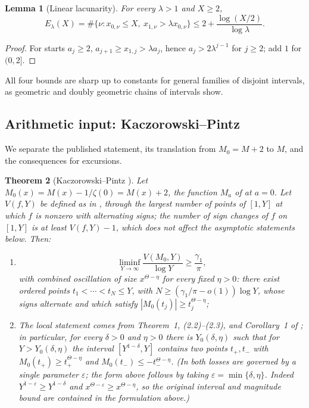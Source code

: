 \documentclass[11pt]{amsart}
\numberwithin{equation}{section}
\theoremstyle{plain}
\newtheorem{theorem}{Theorem}[section]
\newtheorem{lemma}[theorem]{Lemma}
\theoremstyle{definition}
\theoremstyle{remark}
\begin{document}
\begin{lemma}[Linear lacunarity]
\label{lem:linear-lacunary}
For every $\lambda>1$ and $X\ge2$,
\begin{equation}
\label{eq:linear-lacunary-count}
E_\lambda(X)=\#\{\nu:x_{0,\nu}\le X,\ x_{1,\nu}>\lambda x_{0,\nu}\}
\le2+\frac{\log(X/2)}{\log\lambda}.
\end{equation}
\end{lemma}

\begin{proof}
For starts $a_j\ge2$, $a_{j+1}\ge x_{1,j}>\lambda a_j$, hence
$a_j>2\lambda^{j-1}$ for $j\ge2$; add $1$ for $(0,2]$.
\end{proof}

All four bounds are sharp up to constants for general families of disjoint
intervals, as geometric and doubly geometric chains of intervals show.

\subsection{Arithmetic input: Kaczorowski--Pintz}

We separate the published statement, its translation from $M_0=M+2$ to
$M$, and the consequences for excursions.

\begin{theorem}[Kaczorowski--Pintz {\cite{KP86}}]
\label{thm:KP-quoted}
Let $M_0(x)=M(x)-1/\zeta(0)=M(x)+2$, the function $M_a$ of \cite{KP86} at
$a=0$. Let $V(f,Y)$ be defined as in \cite{KP86}, through the largest number of
points of $[1,Y]$ at which $f$ is nonzero with alternating signs; the number
of sign changes of $f$ on $[1,Y]$ is at least $V(f,Y)-1$, which does not
affect the asymptotic statements below. Then:
\begin{enumerate}[label=\textup{(\roman*)}]
\item \cite[Corollary~4, p.~178, (2.13)--(2.15)]{KP86}
\begin{equation}
\label{eq:KP-signchanges}
\liminf_{Y\to\infty}\frac{V(M_0,Y)}{\log Y}\ge\frac{\gamma_1}{\pi},
\end{equation}
with combined oscillation of size $x^{\Theta-\eta}$ for every fixed
$\eta>0$: there exist ordered points $t_1<\cdots<t_N\le Y$, with
$N\ge(\gamma_1/\pi-o(1))\log Y$, whose signs alternate and which satisfy
$|M_0(t_j)|\ge t_j^{\Theta-\eta}$;
\item The local statement comes from Theorem~1, (2.2)--(2.3), and
Corollary~1 of \cite{KP86}; in particular,
for every $\delta>0$ and $\eta>0$ there is $Y_0(\delta,\eta)$ such that for
$Y>Y_0(\delta,\eta)$ the interval $[Y^{1-\delta},Y]$ contains two points
$t_+,t_-$ with $M_0(t_+)\ge t_+^{\Theta-\eta}$ and
$M_0(t_-)\le-t_-^{\Theta-\eta}$. (In \cite{KP86} both losses are governed
by a single parameter $\varepsilon$; the form above follows by taking
$\varepsilon=\min\{\delta,\eta\}$.  Indeed
$Y^{1-\varepsilon}\ge Y^{1-\delta}$ and
$x^{\Theta-\varepsilon}\ge x^{\Theta-\eta}$, so the original
interval and magnitude bound are contained in the formulation above.)
\end{enumerate}
\end{theorem}
\end{document}

